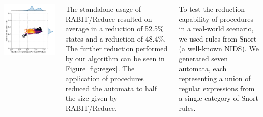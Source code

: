 \documentclass[25pt, a1paper, portrait]{tikzposter}
\begin{document}
\begin{columns}
{\begin{tikzfigure}
\begin{minipage}{0.21\textwidth}
                \includegraphics[width=1\linewidth]{images/intersect-all-trans.pdf}
            \end{minipage}
            \label{fig:regex}
        \end{tikzfigure}

        The standalone usage of RABIT/Reduce resulted on average in a reduction of 52.5\% states and a reduction of 48.4\%. The further reduction performed by our algorithm can be seen in Figure \ref{fig:regex}. The application of procedures reduced the automata to half the size given by RABIT/Reduce.
    }

     {

        To test the reduction capability of procedures in a real-world scenario, we used rules from Snort (a well-known NIDS). We generated seven automata, each representing a union of regular expressions from a single category of Snort rules.

}
\end{columns}
\end{document}
